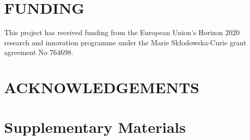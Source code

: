 \documentclass[11pt, a4paper]{article}
\begin{document}
\nolinenumbers
\section*{FUNDING}
\linenumbers
This project has received funding from the European Union's Horizon 2020 research and innovation programme under the Marie Skłodowska-Curie grant agreement No 764698.

\nolinenumbers
\section*{ACKNOWLEDGEMENTS}
\linenumbers

\nolinenumbers


\nolinenumbers
\singlespacing
\newrefcontext[sorting=ydnt]
\printbibliography

\clearpage
\setcounter{figure}{0}
\setcounter{table}{0}
\setcounter{page}{1}
\renewcommand{\thepage}{S\arabic{page}}
\renewcommand{\thesection}{S\arabic{section}}
\renewcommand{\thetable}{S\arabic{table}}
\renewcommand{\thefigure}{S\arabic{figure}}
\section*{Supplementary Materials}
\label{sec:supplementary}
\end{document}
